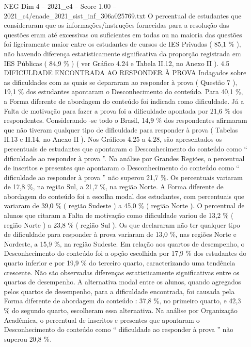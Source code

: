 \begin{textsample}{NEG Dim 4 – 2021\_c4 – Score 1.00 – 2021\_c4/enade\_2021\_sist\_inf\_306a025769.txt}
O percentual de estudantes que consideraram que as informações/instruções fornecidas para a resolução das questões eram até excessivas ou suficientes em todas ou na maioria das questões foi ligeiramente maior entre os estudantes de cursos de IES Privadas ( 85,1 \% ), não havendo diferença estatisticamente significativa da proporção registrada em IES Públicas ( 84,9 \% ) ( ver Gráfico 4.24 e Tabela II.12, no Anexo II ). 4.5 DIFICULDADE ENCONTRADA AO RESPONDER À PROVA Indagados sobre as dificuldades com as quais se depararam ao responder à prova ( Questão 7 ), 19,1 \% dos estudantes apontaram o Desconhecimento do conteúdo.
Para 40,1 \%, a Forma diferente de abordagem do conteúdo foi indicada como dificuldade.
Já a Falta de motivação para fazer a prova foi a dificuldade apontada por 21,6 \% dos respondentes.
Considerando -se todo o Brasil, 14,9 \% dos respondentes afirmaram que não tiveram qualquer tipo de dificuldade para responder à prova ( Tabelas II.13 e II.14, no Anexo II ).
Nos Gráficos 4.25 a 4.28, são apresentados os percentuais de estudantes que apontaram o Desconhecimento do conteúdo como “ dificuldade ao responder à prova ”.
Na análise por Grandes Regiões, o percentual de inscritos e presentes que apontaram o Desconhecimento do conteúdo como “ dificuldade ao responder à prova ” não superou 21,7 \%.
Os percentuais variaram de 17,8 \%, na região Sul, a 21,7 \%, na região Norte.
A Forma diferente de abordagem do conteúdo foi a escolha modal dos estudantes, com percentuais que variaram de 39,0 \% ( região Sudeste ) a 45,0 \% ( região Norte ).
O percentual de alunos que citaram a Falta de motivação como dificuldade variou de 13,2 \% ( região Norte ) a 23,8 \% ( região Sul ).
Os que declararam não ter qualquer tipo de dificuldade para responder à prova variaram de 13,0 \%, nas regiões Norte e Nordeste, a 15,9 \%, na região Sudeste.
Em relação aos quartos de desempenho, o Desconhecimento do conteúdo foi a opção escolhida por 17,9 \% dos estudantes do quarto inferior e por 19,9 \% do terceiro quarto, caracterizando uma tendência crescente.
Não são observadas diferenças estatisticamente significativas entre os quartos de desempenho.
A alternativa modal entre os alunos, quando agregados pelos quartos de desempenho, para a dificuldade encontrada, foi causada pela Forma diferente de abordagem do conteúdo : 37,8 \%, no primeiro quarto, e 42,3 \% do segundo quarto, escolheram essa alternativa.
Na análise por Organização Acadêmica, o percentual de inscritos e presentes que apontaram o Desconhecimento do conteúdo como “ dificuldade ao responder à prova ” não superou 20,8 \%.

\end{textsample}
